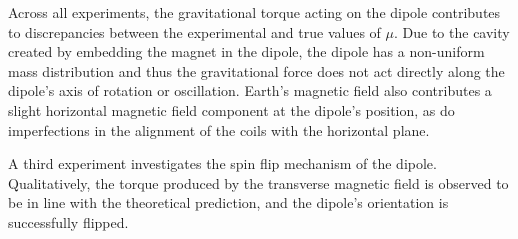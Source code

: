 \documentclass[11pt]{article}
\begin{document}
\vspace{1em}

Across all experiments, the gravitational torque acting on the dipole
contributes to discrepancies between the experimental and true values
of $\mu$. Due to the cavity created by embedding the magnet in the
dipole, the dipole has a non-uniform mass distribution and thus the
gravitational force does not act directly along the dipole's axis of
rotation or oscillation. Earth's magnetic field also contributes
a slight horizontal magnetic field component at the dipole's
position, as do imperfections in the alignment of the coils with the
horizontal plane.

\vspace{1em}

A third experiment investigates the spin flip mechanism of the dipole.
Qualitatively, the torque produced by the transverse magnetic field
is observed to be in line with the theoretical prediction, and the
dipole's orientation is successfully flipped.



\end{document}
